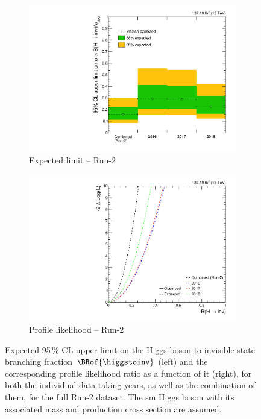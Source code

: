 \begin{figure}[htbp]
    \centering
    \begin{subfigure}[t]{0.45\textwidth}
        \includegraphics[width=\textwidth]{figures/limits/full_Run2/limit_Run2_comb_per_year_Scenario5.pdf}
        \caption{Expected limit -- Run-2}
    \end{subfigure}
    \hspace{0.05\textwidth}
    \begin{subfigure}[t]{0.45\textwidth}
        \includegraphics[width=\textwidth]{figures/likelihood_scan/profile_likelihood_scan_Run2_per_year_Scenario5.pdf}
        \caption{Profile likelihood -- Run-2}
    \end{subfigure}
    \caption[Expected 95\,\% CL upper limit on the Higgs boson to invisible state branching fraction $\BRof{\higgstoinv}$ and the corresponding profile likelihood ratio as a function of it, for both the individual data taking years, as well as the combination of them, for the full Run-2 dataset]{Expected 95\,\% CL upper limit on the Higgs boson to invisible state branching fraction $\BRof{\higgstoinv}$ (left) and the corresponding profile likelihood ratio as a function of it (right), for both the individual data taking years, as well as the combination of them, for the full Run-2 dataset. The \acrlong{sm} Higgs boson with its associated mass and production cross section are assumed.}
    \label{fig:htoinv_limit_likelihood_Run2_per_year}
\end{figure}

